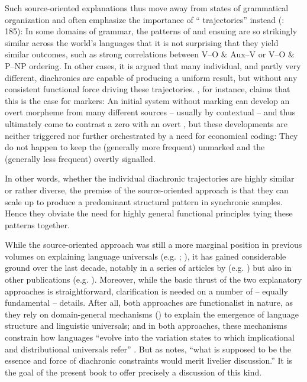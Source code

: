 \documentclass[output=paper]{langsci/langscibook}
\begin{document}
Such source-oriented explanations thus move away from  states of grammatical organization and often emphasize the importance of “ trajectories” instead (\citealt{BybeeBeckner2015}: 185): In some domains of grammar, the patterns of  and ensuing  are so strikingly similar across the world’s languages that it is not surprising that they yield similar outcomes, such as strong correlations between V–O \& Aux–V or V–O \& P–NP ordering. In other cases, it is argued that many individual, and partly very different, diachronies are capable of producing a uniform result, but without any consistent functional force driving these trajectories. \citet{Cristofaro2017}, for instance, claims that this is the case for  markers: An initial system without  marking can develop an overt  morpheme from many different sources – usually by contextual  – and thus ultimately come to contrast a zero  with an overt , but these developments are neither triggered nor further orchestrated by a need for economical coding: They do not happen to keep the (generally more frequent)  unmarked and the (generally less frequent)  overtly signalled. 

In other words, whether the individual diachronic trajectories are highly similar or rather diverse, the premise of the source-oriented approach is that they can scale up to produce a predominant structural pattern in synchronic samples. Hence they obviate the need for highly general functional principles tying these patterns together.

While the source-oriented approach was still a more marginal position in previous volumes on explaining language universals (e.g. \citealt{Hawkins1988_ExplEd}; \citealt{Good2008_Change}), it has gained considerable ground over the last decade, notably in a series of articles by  (e.g. \citealt{Cristofaro2012,Cristofaro2014,Cristofaro2017}) but also in other publications (e.g. \citealt{Anderson2016,Creissels2008,GildeaZúñiga2016}). Moreover, while the basic thrust of the two explanatory approaches is straightforward, clarification is needed on a number of – equally fundamental – details. After all, both approaches are functionalist in nature, as they rely on domain-general mechanisms (\citealt{Bybee2010}) to explain the emergence of language structure and linguistic universals; and in both approaches, these mechanisms constrain how languages “evolve into the variation states to which implicational and distributional universals refer” \citep[18]{Hawkins1988_Intro}. But as \citet[51]{Plank2007} notes, “what is supposed to be the essence and force of diachronic constraints would merit livelier discussion.” It is the goal of the present book to offer precisely a discussion of this kind.
\end{document}
